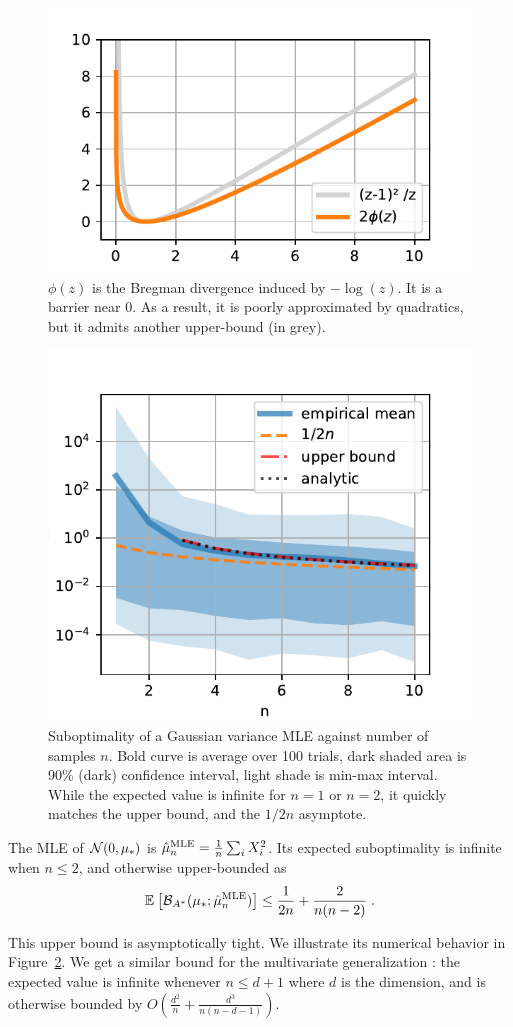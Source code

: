 \documentclass[twoside]{article}
\newcommand*{\expect}[2][]{\ensuremath{\mathbb{E}_{#1} \left[ #2 \right] }} %
\newcommand{\logpart}{A}
\newcommand{\bregmanconj}{\cB_{\logpart^*}}
\begin{document}
\begin{figure}[ht]
	\centering
	\includegraphics[width=.4\textwidth]{phi.pdf}
	\caption{$\phi(z)$ is the Bregman divergence induced by $-\log(z)$. It is a barrier near $0$. As a result, it is poorly approximated by quadratics, but it admits another upper-bound (in grey).}
	\label{fig:phi}
\end{figure}

\begin{figure}[ht]
	\centering
\includegraphics[width=.4\textwidth]{fewsamples.pdf}
	\caption{Suboptimality of a Gaussian variance MLE against number of samples $n$. Bold curve is average over 100 trials,  dark shaded area is 90\% (dark) confidence interval, light shade is min-max interval. 
		While the expected value is infinite for $n=1$ or $n=2$, it quickly matches the upper bound, and the $1/2n$ asymptote.
	}
	\label{fig:curves}
\end{figure}


\begin{theorem}
	The MLE of ${\mathcal N}(0,\mu_*)$ is $\hat \mu_n^\text{MLE} = \frac{1}{n} \sum_i X_i^2 $.
	Its expected suboptimality is infinite when $n\leq 2$, and otherwise upper-bounded as
	\begin{align}
		 \expect{\bregmanconj( \mu_*; \hat \mu_n^\text{MLE}) }
			\leq \inv{2n} +\frac{2}{n(n-2)} \; .
			\label{eq:MLE_rate}
	\end{align}
\end{theorem}

This upper bound is asymptotically tight.
We illustrate its numerical behavior in Figure~\ref{fig:curves}.
We get a similar bound for the multivariate generalization :
the expected value is infinite whenever $n \leq d+1$ where $d$ is the dimension, and is otherwise bounded by $O(\frac{d^2}{n} + \frac{d^3}{n(n-d-1)} )$.
  
\end{document}
